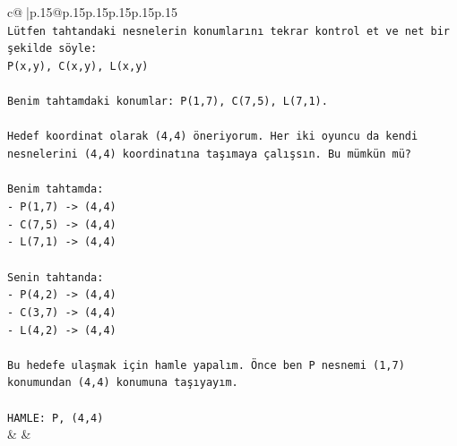 \documentclass{article}
\begin{document}
{\begin{supertabular}{c@{$\;$}|p{.15\linewidth}@{}p{.15\linewidth}p{.15\linewidth}p{.15\linewidth}p{.15\linewidth}p{.15\linewidth}}
{{{\\ 
\texttt{Lütfen tahtandaki nesnelerin konumlarını tekrar kontrol et ve net bir şekilde söyle:} \\
\texttt{P(x,y), C(x,y), L(x,y)} \\
\\ 
\texttt{Benim tahtamdaki konumlar: P(1,7), C(7,5), L(7,1).} \\
\\ 
\texttt{Hedef koordinat olarak (4,4) öneriyorum. Her iki oyuncu da kendi nesnelerini (4,4) koordinatına taşımaya çalışsın. Bu mümkün mü?} \\
\\ 
\texttt{Benim tahtamda:} \\
\texttt{{-} P(1,7) {-}> (4,4)} \\
\texttt{{-} C(7,5) {-}> (4,4)} \\
\texttt{{-} L(7,1) {-}> (4,4)} \\
\\ 
\texttt{Senin tahtanda:} \\
\texttt{{-} P(4,2) {-}> (4,4)} \\
\texttt{{-} C(3,7) {-}> (4,4)} \\
\texttt{{-} L(4,2) {-}> (4,4)} \\
\\ 
\texttt{Bu hedefe ulaşmak için hamle yapalım. Önce ben P nesnemi (1,7) konumundan (4,4) konumuna taşıyayım.} \\
\\ 
\texttt{HAMLE: P, (4,4)} \\
            }
        }
    }
    & & \\ \\


\end{supertabular}}
\end{document}
